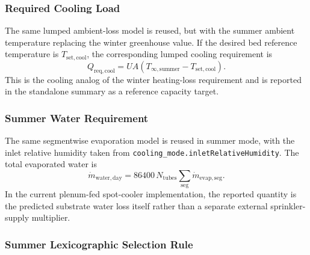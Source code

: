 \documentclass{article}
\begin{document}
\subsubsection{Required Cooling Load}

The same lumped ambient-loss model is reused, but with the summer ambient
temperature replacing the winter greenhouse value. If the desired bed
reference temperature is $T_{\mathrm{set,cool}}$, the corresponding lumped
cooling requirement is
\begin{equation}
Q_{\mathrm{req,cool}}
= UA\left(T_{\infty,\mathrm{summer}} - T_{\mathrm{set,cool}}\right).
\end{equation}
This is the cooling analog of the winter heating-loss requirement and is
reported in the standalone summary as a reference capacity target.

\subsubsection{Summer Water Requirement}

The same segmentwise evaporation model is reused in summer mode, with the
inlet relative humidity taken from
\texttt{cooling\_mode.inletRelativeHumidity}. The total evaporated water is
\begin{equation}
\dot m_{\mathrm{water,day}}
= 86400 \,
N_{\mathrm{tubes}}
\sum_{\mathrm{seg}} \dot m_{\mathrm{evap,seg}}.
\end{equation}
In the current plenum-fed spot-cooler implementation, the reported quantity is the
predicted substrate water loss itself rather than a separate external
sprinkler-supply multiplier.

\subsubsection{Summer Lexicographic Selection Rule}
\end{document}
